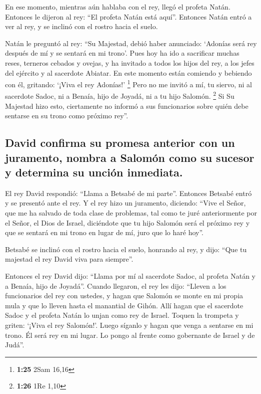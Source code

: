  En ese momento, mientras aún hablaba con el rey, llegó
el profeta Natán.  Entonces le dijeron al rey: ``El
profeta Natán está aquí''. Entonces Natán entró a ver al rey, y se
inclinó con el rostro hacia el suelo.

 Natán le preguntó al rey: ``Su Majestad, debió haber
anunciado: `Adonías será rey después de mí y se sentará en mi trono'.
 Pues hoy ha ido a sacrificar muchas reses, terneros
cebados y ovejas, y ha invitado a todos los hijos del rey, a los jefes
del ejército y al sacerdote Abiatar. En este momento están comiendo y
bebiendo con él, gritando: `¡Viva el rey Adonías!' \footnote{\textbf{1:25}
  2Sam 16,16}  Pero no me invitó a mí, tu siervo, ni al
sacerdote Sadoc, ni a Benaía, hijo de Joyadá, ni a tu hijo Salomón.
\footnote{\textbf{1:26} 1Re 1,10}  Si Su Majestad hizo
esto, ciertamente no informó a sus funcionarios sobre quién debe
sentarse en su trono como próximo rey''.

\hypertarget{david-confirma-su-promesa-anterior-con-un-juramento-nombra-a-salomuxf3n-como-su-sucesor-y-determina-su-unciuxf3n-inmediata.}{%
\subsection{David confirma su promesa anterior con un juramento, nombra
a Salomón como su sucesor y determina su unción
inmediata.}\label{david-confirma-su-promesa-anterior-con-un-juramento-nombra-a-salomuxf3n-como-su-sucesor-y-determina-su-unciuxf3n-inmediata.}}

 El rey David respondió: ``Llama a Betsabé de mi parte''.
Entonces Betsabé entró y se presentó ante el rey.  Y el
rey hizo un juramento, diciendo: ``Vive el Señor, que me ha salvado de
toda clase de problemas, tal como te juré anteriormente por el Señor, el
Dios de Israel,  diciéndote que tu hijo Salomón será el
próximo rey y que se sentará en mi trono en lugar de mí, juro que lo
haré hoy''.

 Betsabé se inclinó con el rostro hacia el suelo,
honrando al rey, y dijo: ``Que tu majestad el rey David viva para
siempre''.

 Entonces el rey David dijo: ``Llama por mí al sacerdote
Sadoc, al profeta Natán y a Benaía, hijo de Joyadá''. Cuando llegaron,
 el rey les dijo: ``Lleven a los funcionarios del rey con
ustedes, y hagan que Salomón se monte en mi propia mula y que lo lleven
hasta el manantial de Gihón.  Allí hagan que el sacerdote
Sadoc y el profeta Natán lo unjan como rey de Israel. Toquen la trompeta
y griten: `¡Viva el rey Salomón!'.  Luego síganlo y hagan
que venga a sentarse en mi trono. Él será rey en mi lugar. Lo pongo al
frente como gobernante de Israel y de Judá''.

